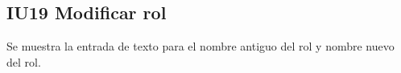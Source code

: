 \newpage
\subsection{IU19 Modificar rol}
Se muestra la entrada de texto para el nombre antiguo del rol y nombre nuevo del rol.
